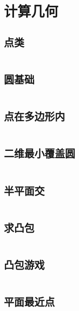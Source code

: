 \chapter{计算几何}
\section{点类}
\inputminted{cpp}{\source/computational-geometry/point.cpp}
\section{圆基础}
\inputminted{cpp}{\source/computational-geometry/circle.cpp}
\section{点在多边形内}
\inputminted{cpp}{\source/computational-geometry/point-in-polygon.cpp}
\section{二维最小覆盖圆}
\inputminted{cpp}{\source/computational-geometry/mincir.cpp}
\section{半平面交}
\inputminted{cpp}{\source/computational-geometry/halfplaneintersection.cpp}
\section{求凸包}
\inputminted{cpp}{\source/computational-geometry/convex-hull.cpp}
\section{凸包游戏}
\inputminted{cpp}{\source/computational-geometry/PlayWithConvex.cpp}
\section{平面最近点}
\inputminted{cpp}{\source/closest-pair-of-points.cpp}
